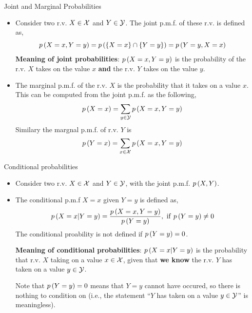 \documentclass[aspectratio=169]{beamer}
\let\olditem\item
\renewcommand{\item}{\setlength{\itemsep}{\fill}\olditem}
\def\mc{\ensuremath\mathcal}
\def\lp{\ensuremath\left(}
\def\rp{\ensuremath\right)}
\def\lc{\ensuremath\left\{}
\def\rc{\ensuremath\right\}}
\begin{document}
\begin{frame}{Joint and Marginal Probabilities}
  \begin{itemize}
    \item Consider two r.v. $X \in \mc{X}$ and $Y \in \mc{Y}$. The joint p.m.f. of these r.v. is defined as,
    \[ p\lp X = x, Y = y\rp = p\lp \lc X = x\rc \cap \lc Y = y \rc \rp = p\lp Y = y, X = x\rp \]
    \textbf{Meaning of joint probabilities}: $p\lp X = x, Y = y\rp$ is the probability of the r.v. $X$ takes on the value $x$ \textbf{and} the r.v. $Y$ takes on the value $y$.
    
    \item The marginal p.m.f. of the r.v. $X$ is the probability that it takes on a value $x$. This can be computed from the joint p.m.f. as the following,
    \[ p\lp X = x \rp = \sum_{y \in \mc{Y}} p\lp X=  x, Y = y \rp \]
    Similary the margnal p.m.f. of r.v. $Y$ is
    \[ p\lp Y = x \rp = \sum_{x \in \mc{X}} p\lp X =  x, Y = y \rp \]
  \end{itemize}
\end{frame}


\begin{frame}{Conditional probabilities}
  \begin{itemize}
    \item Consider two r.v. $X \in \mc{X}$ and $Y \in \mc{Y}$, with the joint p.m.f. $p\lp X, Y\rp$.
    
    \item The conditional p.m.f $X = x$ given $Y = y$ is defined as,
    \[ p\lp X = x \vert Y = y \rp =  \frac{p\lp X = x, Y = y\rp}{p\lp Y = y \rp}, \,\, \mathrm{if } \,\, p\lp Y = y \rp \neq 0 \]
    The conditional proability is not defined if $p\lp Y = y \rp = 0$.

    \textbf{Meaning of conditional probabilities}: $p\lp X = x \vert Y = y \rp$ is the probability that r.v. $X$ taking on a value $x \in \mc{X}$, given that \textbf{we know} the r.v. $Y$ has taken on a value $y \in \mc{Y}$. 
    
    Note that $p\lp Y = y \rp = 0$ means that $Y = y$ cannot have occured, so there is nothing to condition on (i.e., the statement ``$Y$ has taken on a value $y \in \mc{Y}$'' is meaningless).
  \end{itemize}
\end{frame}
\end{document}
